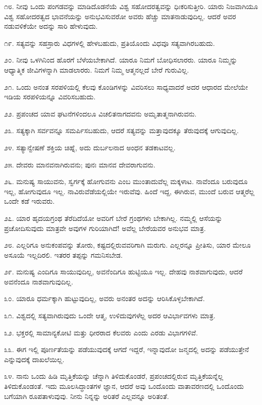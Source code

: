 ೧೮. ನೀವು ಒಂದು ಪಂಗಡವನ್ನು ಮಾಡಿದೊಡನೆಯೆ ವಿಶ್ವ ಸಹೋದರತ್ವವನ್ನು ಧಿಃಕರಿಸುತ್ತೀರಿ. ಯಾರು ನಿಜವಾಗಿಯೂ ವಿಶ್ವ ಸಹೋದರತ್ವದ ಭಾವನೆಯನ್ನು ಅನುಭವಿಸುವರೋ ಅವರು ಹೆಚ್ಚು ಮಾತನಾಡುವುದಿಲ್ಲ. ಆದರೆ ಅವರ ನಡುವಳಿಕೆಯೇ ಅದನ್ನು ಸಾರಿ ಹೇಳುವುದು.

೧೯. ಸತ್ಯವನ್ನು ಸಹಸ್ರಾರು ವಿಧಗಳಲ್ಲಿ ಹೇಳಬಹುದು, ಪ್ರತಿಯೊಂದು ವಿಧವೂ ಸತ್ಯವಾಗಿರಬಹುದು.

೨೦. ನೀವು ಒಳಗಿನಿಂದ ಹೊರಗೆ ಬೆಳೆಯಬೇಕಾಗಿದೆ. ಯಾರೂ ನಿಮಗೆ ಬೋಧಿಸಲಾರರು. ಯಾರೂ ನಿಮ್ಮನ್ನು ಆಧ್ಯಾತ್ಮಿಕ ಜೀವಿಗಳನ್ನಾಗಿ ಮಾಡಲಾರರು. ನಿಮಗೆ ನಿಮ್ಮ ಆತ್ಮನಲ್ಲದೆ ಬೇರೆ ಗುರುವಿಲ್ಲ.

೨೧. ಒಂದು ಅನಂತ ಸರಪಳಿಯಲ್ಲಿ ಕೆಲವು ಕೊಂಡಿಗಳನ್ನು ವಿವರಿಸಲು ಸಾಧ್ಯವಾದರೆ ಅದರ ಆಧಾರದ ಮೇಲೆಯೇ ಇಡಿಯ ಸರಪಳಿಯನ್ನೂ ವಿವರಿಸಬಹುದು.

೨೨. ಪ್ರಪಂಚದ ಯಾವ ಘಟನೆಗಳಿಂದಲೂ ವಿಚಲಿತನಾಗದವನು ಅಮೃತಾತ್ಮನಾಗಿರುವನು.

೨೩. ಸತ್ಯಕ್ಕಾಗಿ ಸರ್ವವನ್ನೂ ಸಮರ್ಪಿಸಬಹುದು, ಆದರೆ ಸತ್ಯವನ್ನು ಮತ್ತಾವುದಕ್ಕೂ ತೆರುವುದಕ್ಕೆ ಆಗುವುದಿಲ್ಲ.

೨೪. ಸತ್ಯಾನ್ವೇಷಣೆ ಶಕ್ತಿಯ ಚಿಹ್ನೆ, ಅದು ದುರ್ಬಲನಾದ ಅಂಧನ ತಡಕಾಟವಲ್ಲ.

೨೫. ದೇವರು ಮಾನವನಾಗಿರುವನು; ಪುನಃ ಮಾನವ ದೇವರಾಗುವನು.

೨೬. ಮನುಷ್ಯ ಸಾಯುವನು, ಸ್ವರ್ಗಕ್ಕೆ ಹೋಗುವನು ಎಂಬ ಮುಂತಾದುವೆಲ್ಲ ಮಕ್ಕಳಾಟ. ನಾವೆಂದೂ ಬರುವುದೂ ಇಲ್ಲ, ಹೋಗುವುದೂ ಇಲ್ಲ. ನಾವಿರುವೆಡೆಯಲ್ಲಿಯೇ ಇರುವೆವು. ಹಿಂದೆ ಇದ್ದ, ಈಗಿರುವ, ಮುಂದೆ ಬರುವ ಆತ್ಮರೆಲ್ಲ ಒಂದೇ ಕಡೆ ಇರುವರು.

೨೭. ಯಾರ ಹೃದಯಗ್ರಂಥ ತೆರೆದಿದೆಯೋ ಅವರಿಗೆ ಬೇರೆ ಗ್ರಂಥಗಳು ಬೇಕಾಗಿಲ್ಲ. ನಮ್ಮಲ್ಲಿ ಆಸೆಯನ್ನು ಪ್ರಚೋದಿಸುವುದು ಮಾತ್ರವೇ ಅವುಗಳ ಗುರಿಯಾಗಿದೆ! ಅವೆಲ್ಲ ಬೇರೆಯವರ ಅನುಭವ ಮಾತ್ರ.

೨೮. ಎಲ್ಲರಿಗೂ ಅನುಕಂಪವನ್ನು ತೋರು, ಕಷ್ಟದಲ್ಲಿರುವವರಿಗಾಗಿ ಮರುಗು. ಎಲ್ಲರನ್ನೂ ಪ್ರೀತಿಸು, ಯಾರ ಮೇಲೂ ಅಸೂಯೆ ಇಲ್ಲದಿರಲಿ. ಇತರರ ತಪ್ಪನ್ನು ಗಮನಿಸಬೇಡ.

೨೯. ಮನುಷ್ಯ ಎಂದಿಗೂ ಸಾಯುವುದಿಲ್ಲ, ಅವನೆಂದಿಗೂ ಹುಟ್ಟಿಯೂ ಇಲ್ಲ. ದೇಹವು ನಾಶವಾಗುವುದು, ಆದರೆ ಅವನೆಂದೂ ನಾಶವಾಗುವುದಿಲ್ಲ.

೩೦. ಯಾರೂ ಧರ್ಮಕ್ಕಾಗಿ ಹುಟ್ಟುವುದಿಲ್ಲ, ಅವರು ಅನಂತರ ಅದನ್ನು ಆರಿಸಿಕೊಳ್ಳಬೇಕಾಗಿದೆ.

೩೧. ವಿಶ್ವದಲ್ಲಿ ಸತ್ಯವಾಗಿರುವುದು ಒಂದೇ ಆತ್ಮ, ಉಳಿದುವುಗಳೆಲ್ಲ ಅದರ ಆವಿರ್ಭಾವಗಳು ಮಾತ್ರ.

೩೨. ಭಕ್ತರಲ್ಲಿ ಸಾಮಾನ್ಯಕೋಟಿ ಮತ್ತು ಧೀರರಾದ ಕೆಲವರು ಎಂದು ಎರಡು ವಿಭಾಗಗಳಿವೆ.

೩೩. ಈಗ ಇಲ್ಲಿ ಪೂರ್ಣತೆಯನ್ನು ಪಡೆಯುವುದಕ್ಕೆ ಆಗದೆ ಇದ್ದರೆ, ಇನ್ನಾವುದೋ ಜನ್ಮದಲ್ಲಿ ಅದನ್ನು ಪಡೆಯುತ್ತೇನೆ ಎನ್ನುವುದಕ್ಕೆ ದಾಖಲೆಯಿಲ್ಲ.

೩೪. ನಾನು ಒಂದು ಹಿಡಿ ಮೃತ್ತಿಕೆಯನ್ನು ಚೆನ್ನಾಗಿ ತಿಳಿದುಕೊಂಡರೆ, ಪ್ರಪಂಚದಲ್ಲಿರುವ ಮೃತ್ತಿಕೆಯನ್ನೆಲ್ಲ ತಿಳಿದುಕೊಂಡಂತೆ. ಇದು ಮೂಲಸಿದ್ಧಾಂತಗಳ ಜ್ಞಾನ, ಆದರೆ ಅವು ಒಂದೊಂದು ವಾತಾವರಣದಲ್ಲಿ ಒಂದೊಂದು ಬಗೆಯಾಗಿ ರೂಪತಾಳುವುವು. ನೀನು ನಿನ್ನನ್ನು ಅರಿತರೆ ಎಲ್ಲವನ್ನೂ ಅರಿತಂತೆ.

